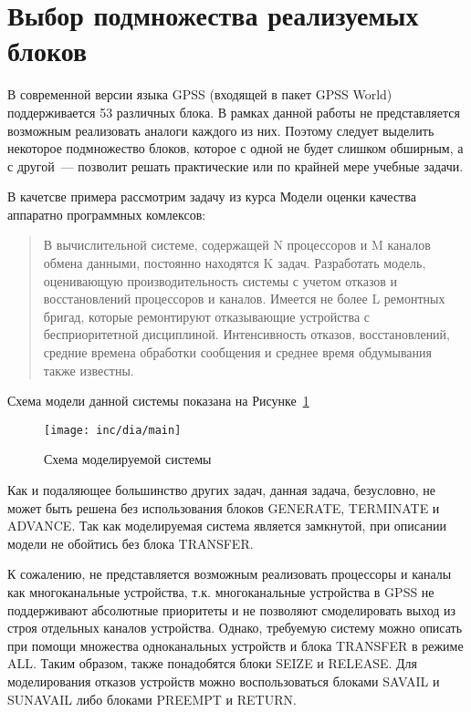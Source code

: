 \section{Выбор подмножества реализуемых блоков}

В современной версии языка GPSS (входящей в пакет GPSS World) поддерживается 53 различных блока.\cite{GPSSRef} В рамках данной работы не представляется возможным реализовать  аналоги каждого из них. Поэтому следует выделить некоторое подмножество блоков, которое с одной не будет слишком обширным, а с другой~--- позволит решать практические или по крайней мере учебные задачи.

В качетсве примера рассмотрим задачу из курса Модели оценки качества аппаратно программных комлексов:

\begin{quote}
В вычислительной системе, содержащей N процессоров и M каналов обмена данными, постоянно находятся K задач. Разработать модель, оценивающую производительность системы с учетом отказов и восстановлений процессоров и каналов. Имеется не более L ремонтных бригад, которые ремонтируют отказывающие устройства с бесприоритетной  дисциплиной. Интенсивность отказов, восстановлений, средние времена обработки сообщения и среднее время обдумывания также известны.
\end{quote}

Схема модели данной системы показана на Рисунке~\ref{fig:mainModel}

\begin{figure}[ht]
\centering
\texttt{[image: inc/dia/main]}
\caption{Схема моделируемой системы}
\label{fig:mainModel}
\end{figure}

Как и подаляющее большинство других задач, данная задача, безусловно, не может быть решена без использования блоков GENERATE, TERMINATE и ADVANCE. Так как моделируемая система является замкнутой, при описании модели не обойтись без блока TRANSFER.

К сожалению, не представляется возможным реализовать процессоры и каналы как многоканальные устройства, т.к. многоканальные устройства в GPSS не поддерживают абсолютные приоритеты и не позволяют смоделировать выход из строя отдельных каналов устройства. Однако, требуемую систему можно описать при помощи множества одноканальных устройств и блока TRANSFER в режиме ALL. Таким образом, также понадобятся блоки SEIZE и RELEASE. Для моделирования отказов устройств можно воспользоваться блоками SAVAIL и SUNAVAIL либо блоками PREEMPT и RETURN.

